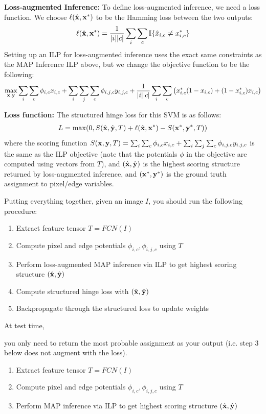 \documentclass[11pt,addpoints,answers]{exam}
\numberwithin{equation}{section} %
\numberwithin{figure}{section} %
\numberwithin{table}{section} %
\newcommand{\recentChange}[1]{{\color{red}#1}}
\newcommand \ind [1]{\mathbb{I}\{#1\}}
\begin{document}
\begin{itemize}
\item 
    \recentChange{
    \textbf{Loss-augmented Inference:} To define loss-augmented inference, we need a loss function. We choose $\ell(\hat {\mathbf{x}}, \mathbf{x}^*)$ to be the Hamming loss between the two outputs:
    \begin{align*}
        \ell(\hat \xv, \xv^*) = \frac{1}{|i||c|} \sum_i \sum_c \ind{\hat{x}_{i,c} \neq x^*_{i,c}}
    \end{align*}
    Setting up an ILP for loss-augmented inference uses the exact same constraints as the MAP Inference ILP above, but we change the objective function to be the following:
    \begin{align*}
     \max_{\mathbf{x}, \mathbf{y}}  \sum_i \sum_c \phi_{i,c} x_{i,c} + \sum_i \sum_j \sum_c \phi_{i,j,c} y_{i,j,c} 
       + \frac{1}{|i||c|} \sum_i \sum_c \left( x^*_{i,c} (1 - x_{i,c}) + (1 - x^*_{i,c}) x_{i,c} \right)
    \end{align*}
    
    
\item \textbf{Loss function:} The structured hinge loss for this SVM is as follows:\\
    \begin{align*}
        L = \max(0, S(\hat {\mathbf{x}}, \hat {\mathbf{y}},  T) + \ell(\hat {\mathbf{x}}, \mathbf{x}^*) - S(\mathbf{x}^*, \mathbf{y}^*, T))
    \end{align*}
    where the scoring function $S(\mathbf{x}, \mathbf{y}, T) = \sum_i \sum_c \phi_{i,c} x_{i,c} + \sum_i \sum_j \sum_c \phi_{i,j,c} y_{i,j,c}$ is the same as the ILP objective (note that the potentials $\phi$ in the objective are computed using vectors from $T$), and $(\hat{\mathbf{x}}, \hat{\mathbf{y}})$ is the highest scoring structure returned by loss-augmented inference, and $(\mathbf{x}^*, \mathbf{y}^*)$ is the ground truth assignment to pixel/edge variables.
    
    }
\end{itemize}

Putting everything together, given an image $I$, you should run the following procedure:
\begin{enumerate}
    \item Extract feature tensor $T = FCN(I)$
    \item Compute pixel and edge potentials $\phi_{i,c}, \phi_{i,j,c}$ using $T$
    \item Perform \recentChange{loss-augmented MAP inference} via ILP to get highest scoring structure $(\hat{\mathbf{x}}, \hat{\mathbf{y}})$
    \item Compute structured hinge loss with $(\hat{\mathbf{x}}, \hat{\mathbf{y}})$
    \item Backpropagate through the structured loss to update weights
\end{enumerate}
At test time, \recentChange{you only need to return the most probable assignment as your output (i.e. step 3 below does not augment with the loss). 
\begin{enumerate}
    \item Extract feature tensor $T = FCN(I)$
    \item Compute pixel and edge potentials $\phi_{i,c}, \phi_{i,j,c}$ using $T$
    \item Perform MAP inference via ILP to get highest scoring structure $(\hat{\mathbf{x}},\hat{\mathbf{y}})$
\end{enumerate}
}
\end{document}
